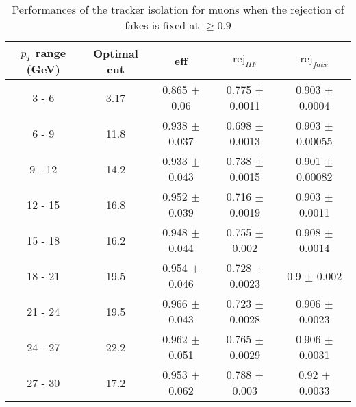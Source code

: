 \begin{table}[htbp]
   \centering
   \begin{tabular}{|c|c|c|c|c|}
      \hline
      $p_T$ range (GeV) & Optimal cut & eff & $\textrm{rej}_{HF}$ & $\textrm{rej}_{fake}$ \\
      \hline
      3 - 6 & 3.17 & 0.865 $\pm$ 0.06 & 0.775 $\pm$ 0.0011 & 0.903 $\pm$ 0.0004 \\
      \hline
      6 - 9 & 11.8 & 0.938 $\pm$ 0.037 & 0.698 $\pm$ 0.0013 & 0.903 $\pm$ 0.00055 \\
      \hline
      9 - 12 & 14.2 & 0.933 $\pm$ 0.043 & 0.738 $\pm$ 0.0015 & 0.901 $\pm$ 0.00082 \\
      \hline
      12 - 15 & 16.8 & 0.952 $\pm$ 0.039 & 0.716 $\pm$ 0.0019 & 0.903 $\pm$ 0.0011 \\
      \hline
      15 - 18 & 16.2 & 0.948 $\pm$ 0.044 & 0.755 $\pm$ 0.002 & 0.908 $\pm$ 0.0014 \\
      \hline
      18 - 21 & 19.5 & 0.954 $\pm$ 0.046 & 0.728 $\pm$ 0.0023 & 0.9 $\pm$ 0.002 \\
      \hline
      21 - 24 & 19.5 & 0.966 $\pm$ 0.043 & 0.723 $\pm$ 0.0028 & 0.906 $\pm$ 0.0023 \\
      \hline
      24 - 27 & 22.2 & 0.962 $\pm$ 0.051 & 0.765 $\pm$ 0.0029 & 0.906 $\pm$ 0.0031 \\
      \hline
      27 - 30 & 17.2 & 0.953 $\pm$ 0.062 & 0.788 $\pm$ 0.003 & 0.92 $\pm$ 0.0033 \\
      \hline
   \end{tabular}
   \caption{\small{Performances of the tracker isolation for muons when the rejection of fakes is fixed at $\geq 0.9$}\label{tab:track_muon_pureFake}}
\end{table}






